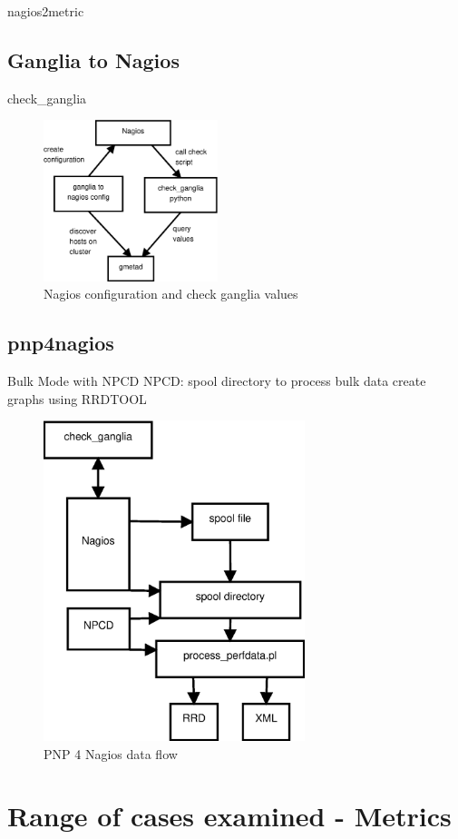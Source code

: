 nagios2metric
\newpage

\subsection{Ganglia to Nagios}
check\_ganglia
\begin{figure}[htb]
\centering
 \includegraphics[width=2in]{images/nagios_check_ganglia.eps}
\caption{Nagios configuration and check ganglia values}
\label{figure:nagios_ganglia}
\end{figure}
\newpage

\subsection{pnp4nagios}

Bulk Mode with NPCD
NPCD:
spool directory to process bulk data
create graphs using RRDTOOL

\begin{figure}[htb]
\centering
 \includegraphics[width=3in]{images/npcd_pnp4nagios.eps}
\caption{PNP 4 Nagios data flow}
\label{figure:pnp4nagios}
\end{figure}
\newpage

\section{Range of cases examined - Metrics}

